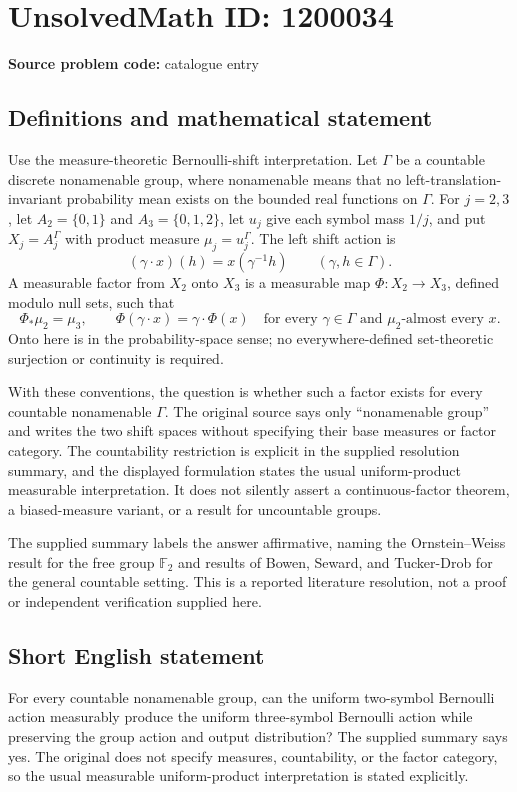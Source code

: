 \documentclass[11pt]{article}
\begin{document}
\section*{UnsolvedMath ID: 1200034}
\textbf{Source problem code:} catalogue entry
\subsection{Definitions and mathematical statement}
Use the measure-theoretic Bernoulli-shift interpretation. Let $\Gamma$ be a countable discrete nonamenable group, where nonamenable means that no left-translation-invariant probability mean exists on the bounded real functions on $\Gamma$. For $j=2,3$, let $A_2=\{0,1\}$ and $A_3=\{0,1,2\}$, let $u_j$ give each symbol mass $1/j$, and put $X_j=A_j^\Gamma$ with product measure $\mu_j=u_j^\Gamma$. The left shift action is
\[
(\gamma\cdot x)(h)=x(\gamma^{-1}h)\qquad(\gamma,h\in\Gamma).
\]
A measurable factor from $X_2$ onto $X_3$ is a measurable map $\Phi:X_2\to X_3$, defined modulo null sets, such that
\[
\Phi_*\mu_2=\mu_3,\qquad
\Phi(\gamma\cdot x)=\gamma\cdot\Phi(x)
\quad\text{for every }\gamma\in\Gamma\text{ and }\mu_2\text{-almost every }x.
\]
Onto here is in the probability-space sense; no everywhere-defined set-theoretic surjection or continuity is required.

With these conventions, the question is whether such a factor exists for every countable nonamenable $\Gamma$. The original source says only ``nonamenable group'' and writes the two shift spaces without specifying their base measures or factor category. The countability restriction is explicit in the supplied resolution summary, and the displayed formulation states the usual uniform-product measurable interpretation. It does not silently assert a continuous-factor theorem, a biased-measure variant, or a result for uncountable groups.

The supplied summary labels the answer affirmative, naming the Ornstein--Weiss result for the free group $\mathbb F_2$ and results of Bowen, Seward, and Tucker-Drob for the general countable setting. This is a reported literature resolution, not a proof or independent verification supplied here.
\subsection{Short English statement}
For every countable nonamenable group, can the uniform two-symbol Bernoulli action measurably produce the uniform three-symbol Bernoulli action while preserving the group action and output distribution? The supplied summary says yes. The original does not specify measures, countability, or the factor category, so the usual measurable uniform-product interpretation is stated explicitly.
\end{document}
